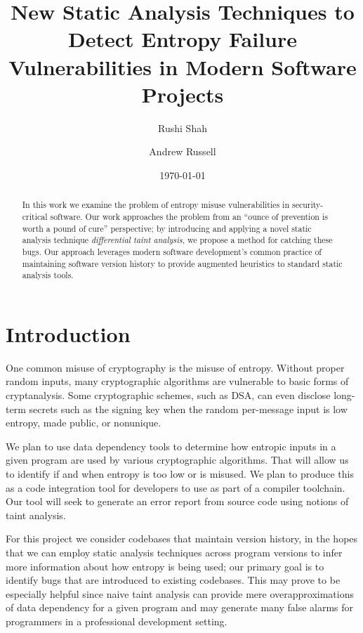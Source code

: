 \documentclass[letterpaper,twocolumn,10pt]{article}
\begin{document}
\date{\today}

\title{\Large \bf New Static Analysis Techniques to Detect Entropy Failure Vulnerabilities in Modern Software Projects}

\author{
{\rm Rushi Shah}
\and
{\rm Andrew Russell}
}

\maketitle

\begin{abstract}
    In this work we examine the problem of entropy misuse vulnerabilities in
    security-critical software. Our work approaches the problem from an
    ``ounce of prevention is worth a pound of cure'' perspective; by introducing
    and applying a novel static analysis technique \emph{differential taint analysis},
    we propose a method for catching these bugs. Our approach
    leverages modern software development's
     common practice of maintaining software version history to 
     provide augmented heuristics to standard static analysis tools.
\end{abstract}

\section{Introduction}

One common misuse of cryptography is the misuse of entropy. Without proper random inputs, many cryptographic algorithms
are vulnerable to basic forms of cryptanalysis. Some cryptographic schemes, such as DSA, can even disclose long-term secrets
such as the signing key when the random per-message input is low entropy, made public, or nonunique.

We plan to use data dependency tools to determine how entropic inputs in a given program are used by various cryptographic algorithms. That will allow us to identify if and when entropy is too low or is misused. We plan to produce this as a code integration tool for developers to use as part of a compiler toolchain.
Our tool will seek to generate an error report from source code using notions of taint analysis. 

For this project we consider codebases that maintain version history, in the hopes that we can employ static analysis techniques across program versions to infer more information about how entropy is being used; 
our primary goal is to identify bugs that are introduced to existing codebases. This may prove to be especially helpful since naive taint analysis can provide mere overapproximations of data dependency for a given program and may generate many false alarms for programmers in a professional development setting.
\end{document}
